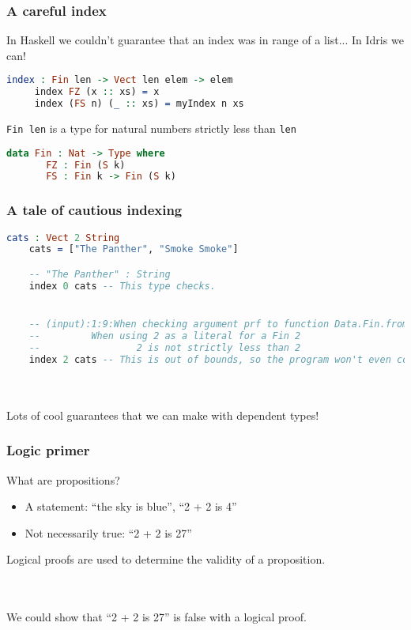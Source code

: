 \documentclass{beamer}
\begin{document}
\begin{frame}[fragile]
  \frametitle{A careful index}

  In Haskell we couldn't guarantee that an index was in range of a list... \pause In Idris we can!

  \pause
  \begin{lstlisting}[language=Idris]
     index : Fin len -> Vect len elem -> elem
     index FZ (x :: xs) = x
     index (FS n) (_ :: xs) = myIndex n xs 
   \end{lstlisting}

   \texttt{Fin len} is a type for natural numbers strictly less than \texttt{len}

   \pause

   \begin{lstlisting}[language=Idris]
     data Fin : Nat -> Type where
       FZ : Fin (S k)
       FS : Fin k -> Fin (S k)
     \end{lstlisting}
\end{frame}

\begin{frame}[fragile]
  \frametitle{A tale of cautious indexing}

  \begin{lstlisting}[language=Idris]
    cats : Vect 2 String
    cats = ["The Panther", "Smoke Smoke"]

    -- "The Panther" : String
    index 0 cats -- This type checks.


    -- (input):1:9:When checking argument prf to function Data.Fin.fromInteger:
    --         When using 2 as a literal for a Fin 2 
    --                 2 is not strictly less than 2
    index 2 cats -- This is out of bounds, so the program won't even compile!
  \end{lstlisting}

  \pause \\~\\

  \huge{Lots of cool guarantees that we can make with dependent types!}
\end{frame}

\begin{frame}
  \frametitle{Logic primer}

  What are propositions?

  \begin{itemize}
  \pause
  \item A statement: ``the sky is blue'', ``2 + 2 is 4''
  \pause
  \item Not necessarily true: ``2 + 2 is 27''
  \end{itemize}

  \pause

  Logical proofs are used to determine the validity of a proposition.

  \pause \\~\\

  We could show that ``2 + 2 is 27'' is false with a logical proof.
\end{frame}
\end{document}
